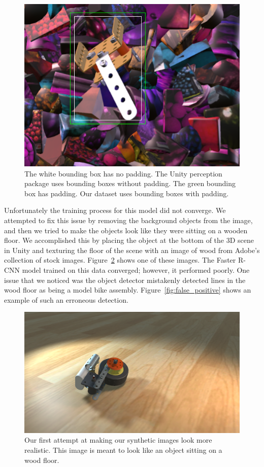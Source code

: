 \begin{figure}
  \includegraphics[width=\columnwidth]{figures/synthetic/padding.png}
  \caption{
    The white bounding box has no padding.
    The Unity perception package uses bounding boxes without padding.
    The green bounding box has padding.
    Our dataset uses bounding boxes with padding.
  }\label{fig:padding}
\end{figure}

Unfortunately the training process for this model did not converge.
We attempted to fix this issue by removing the background objects from the
image, and then we tried to make the objects look like they were sitting on a
wooden floor.
We accomplished this by placing the object at the bottom of the 3D scene in
Unity and texturing the floor of the scene with an image of wood from Adobe's
collection of stock images.
Figure~\ref{fig:wood_floor} shows one of these images.
The Faster R-CNN model trained on this data converged; however, it performed
poorly.
One issue that we noticed was the object detector mistakenly detected lines
in the wood floor as being a model bike assembly.
Figure~\ref{fig:false_positive} shows an example of such an erroneous detection.

\begin{figure}
  \includegraphics[width=\columnwidth]{figures/synthetic/wood_floor.png}
  \caption{
    Our first attempt at making our synthetic images look more realistic.
    This image is meant to look like an object sitting on a wood floor.
  }\label{fig:wood_floor}
\end{figure}

